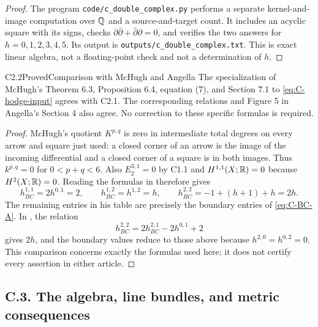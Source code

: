 \begin{proof}
The program \texttt{code/c\_double\_complex.py} performs a separate
kernel-and-image computation over $\mathbb Q$ and a source-and-target
count.  It includes an acyclic square with its signs, checks
$\partial\bar\partial+\bar\partial\partial=0$, and verifies the
two answers for $h=0,1,2,3,4,5$.  Its output is
\texttt{outputs/c\_double\_complex.txt}.  This is exact linear
algebra, not a floating-point check and not a determination of $h$.
\end{proof}

\begin{claim}{C2.2}{Proved}{Comparison with McHugh and Angella}
The specialization of McHugh's Theorem 6.3, Proposition 6.4, equation
(7), and Section 7.1 to \eqref{eq:C-hodge-input} agrees with C2.1.
The corresponding relations and Figure 5 in Angella's Section 4 also
agree.  No correction to these specific formulas is required.
\end{claim}
\begin{proof}
McHugh's quotient $K^{p,q}$ is zero in intermediate total degrees
on every arrow and square just used: a closed corner of an arrow is
the image of the incoming differential and a closed corner of a square
is in both images.  Thus $k^{p,q}=0$ for $0<p+q<6$.
Also $E_2^{3,1}=0$ by C1.1 and $H^{1,1}(X;\mathbb R)=0$ because
$H^2(X;\mathbb R)=0$.  Reading the formulas in
\citet[Theorem 6.3, Proposition 6.4, (7), pp. 20--25]{McHugh2018}
therefore gives
\[
h_{BC}^{1,1}=2h^{0,1}=2,\qquad
h_{BC}^{1,2}=h^{1,2}=h,\qquad
h_{BC}^{2,2}=-1+(h+1)+h=2h.
\]
The remaining entries in his table are precisely the boundary entries
of \eqref{eq:C-BC-A}.  In
\citet[Section 4, pp. 13--16]{Angella2018}, the relation
\[
h_{BC}^{2,2}=2h_{BC}^{2,1}-2h^{0,1}+2
\]
gives $2h$, and the boundary values reduce to those above because
$h^{2,0}=h^{0,2}=0$.  This comparison concerns exactly the formulas
used here; it does not certify every assertion in either article.
\end{proof}

\subsection{C.3. The algebra, line bundles, and metric consequences}

